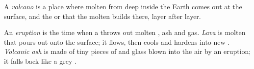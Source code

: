 \begin{definition}[Volcano]\label{def:g4:volcanoes-earthquakes-first-look:volcano}
A \emph{volcano} is a place where molten  from deep
inside the Earth comes out at the surface, and the  or  that
the molten  builds there, layer after layer.
\end{definition}

\begin{definition}\label{def:g4:volcanoes-earthquakes-first-look:eruption}
An \emph{eruption} is the time when a  throws out
molten , ash and gas. \emph{Lava} is molten  that
pours out onto the surface; it flows, then cools and hardens into new .
\emph{Volcanic ash} is made of tiny pieces of  and
glass blown into the air by an eruption; it falls back like a grey .
\end{definition}

